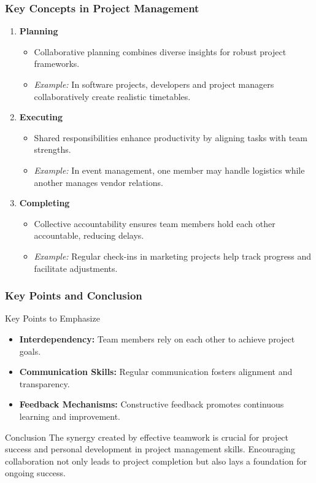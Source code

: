 \documentclass[aspectratio=169]{beamer}
\begin{document}
\begin{frame}[fragile]
    \frametitle{Key Concepts in Project Management}
    \begin{enumerate}
        \item \textbf{Planning}
        \begin{itemize}
            \item Collaborative planning combines diverse insights for robust project frameworks.
            \item \textit{Example:} In software projects, developers and project managers collaboratively create realistic timetables.
        \end{itemize}

        \item \textbf{Executing}
        \begin{itemize}
            \item Shared responsibilities enhance productivity by aligning tasks with team strengths.
            \item \textit{Example:} In event management, one member may handle logistics while another manages vendor relations.
        \end{itemize}

        \item \textbf{Completing}
        \begin{itemize}
            \item Collective accountability ensures team members hold each other accountable, reducing delays.
            \item \textit{Example:} Regular check-ins in marketing projects help track progress and facilitate adjustments.
        \end{itemize}
    \end{enumerate}
\end{frame}

\begin{frame}[fragile]
    \frametitle{Key Points and Conclusion}
    \begin{block}{Key Points to Emphasize}
        \begin{itemize}
            \item \textbf{Interdependency:} Team members rely on each other to achieve project goals.
            \item \textbf{Communication Skills:} Regular communication fosters alignment and transparency.
            \item \textbf{Feedback Mechanisms:} Constructive feedback promotes continuous learning and improvement.
        \end{itemize}
    \end{block}
    
    \begin{block}{Conclusion}
        The synergy created by effective teamwork is crucial for project success and personal development in project management skills. Encouraging collaboration not only leads to project completion but also lays a foundation for ongoing success.
    \end{block}
\end{frame}
\end{document}
